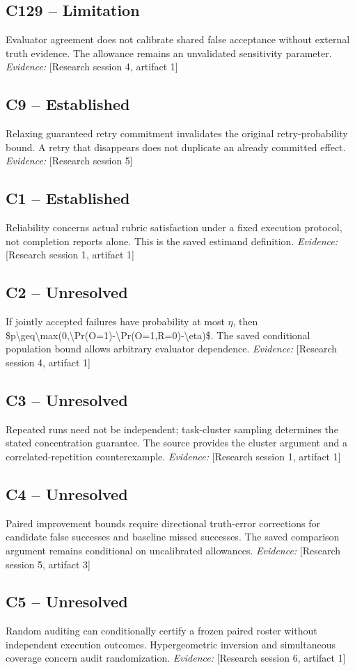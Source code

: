 \documentclass[11pt]{article}
\begin{document}
\begin{sloppypar}
\subsection{C129 -- Limitation}
Evaluator agreement does not calibrate shared false acceptance without external truth evidence.
The allowance remains an unvalidated sensitivity parameter.
\textit{Evidence: }[Research session 4, artifact 1]
\subsection{C9 -- Established}
Relaxing guaranteed retry commitment invalidates the original retry-probability bound.
A retry that disappears does not duplicate an already committed effect.
\textit{Evidence: }[Research session 5]
\subsection{C1 -- Established}
Reliability concerns actual rubric satisfaction under a fixed execution protocol, not completion reports alone.
This is the saved estimand definition.
\textit{Evidence: }[Research session 1, artifact 1]
\subsection{C2 -- Unresolved}
If jointly accepted failures have probability at most $\eta$, then \$p\textbackslash{}geq\textbackslash{}max(0,\textbackslash{}Pr(O=1)-\textbackslash{}Pr(O=1,R=0)-\textbackslash{}eta)\$.
The saved conditional population bound allows arbitrary evaluator dependence.
\textit{Evidence: }[Research session 4, artifact 1]
\subsection{C3 -- Unresolved}
Repeated runs need not be independent; task-cluster sampling determines the stated concentration guarantee.
The source provides the cluster argument and a correlated-repetition counterexample.
\textit{Evidence: }[Research session 1, artifact 1]
\subsection{C4 -- Unresolved}
Paired improvement bounds require directional truth-error corrections for candidate false successes and baseline missed successes.
The saved comparison argument remains conditional on uncalibrated allowances.
\textit{Evidence: }[Research session 5, artifact 3]
\subsection{C5 -- Unresolved}
Random auditing can conditionally certify a frozen paired roster without independent execution outcomes.
Hypergeometric inversion and simultaneous coverage concern audit randomization.
\textit{Evidence: }[Research session 6, artifact 1]

\end{sloppypar}
\end{document}
